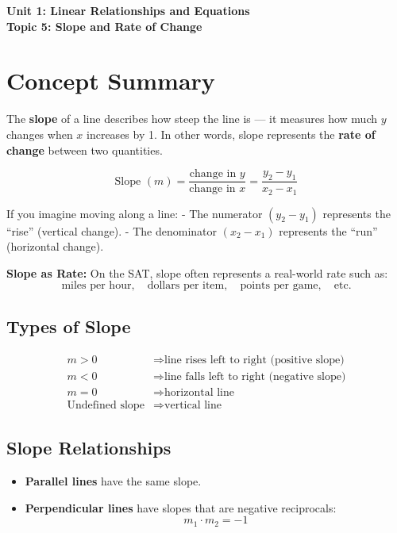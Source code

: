 \documentclass[14pt]{extarticle}
\begin{document}
\raggedright
{}

\begin{center}
    \LARGE \textbf{Unit 1: Linear Relationships and Equations} \\[6pt]
    \Large \textbf{Topic 5: Slope and Rate of Change}
\end{center}

\vspace{1em}

\section*{Concept Summary}

The \textbf{slope} of a line describes how steep the line is — it measures how much \(y\) changes when \(x\) increases by 1.  
In other words, slope represents the \textbf{rate of change} between two quantities.

\[
\text{Slope } (m) = \frac{\text{change in } y}{\text{change in } x} = \frac{y_2 - y_1}{x_2 - x_1}
\]

If you imagine moving along a line:
- The numerator \((y_2 - y_1)\) represents the “rise” (vertical change).  
- The denominator \((x_2 - x_1)\) represents the “run” (horizontal change).  

\textbf{Slope as Rate:}  
On the SAT, slope often represents a real-world rate such as:
\[
\text{miles per hour}, \quad \text{dollars per item}, \quad \text{points per game}, \quad \text{etc.}
\]

\subsection*{Types of Slope}
\[
\begin{aligned}
m > 0 &\Rightarrow \text{line rises left to right (positive slope)} \\
m < 0 &\Rightarrow \text{line falls left to right (negative slope)} \\
m = 0 &\Rightarrow \text{horizontal line} \\
\text{Undefined slope} &\Rightarrow \text{vertical line}
\end{aligned}
\]

\subsection*{Slope Relationships}
\begin{itemize}
    \item \textbf{Parallel lines} have the same slope.
    \item \textbf{Perpendicular lines} have slopes that are negative reciprocals:  
    \[
    m_1 \cdot m_2 = -1
    \]
\end{itemize}
\end{document}
